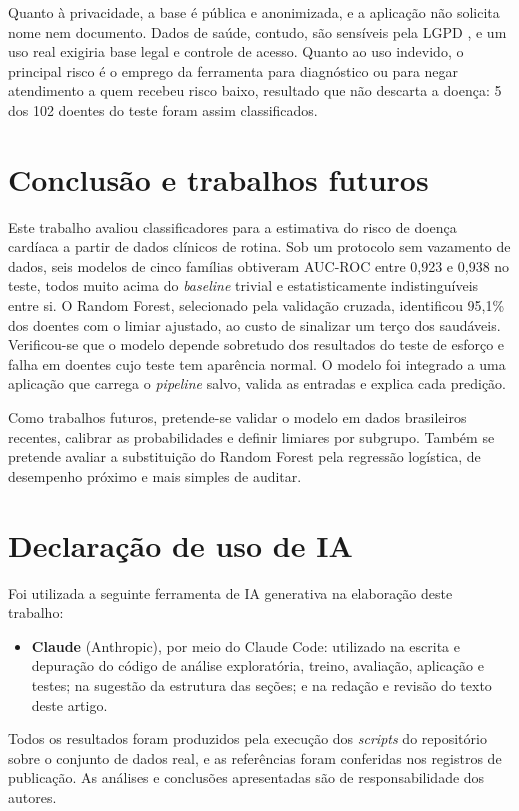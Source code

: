 \documentclass[12pt]{article}
\begin{document}
Quanto à privacidade, a base é pública e anonimizada, e a aplicação não
solicita nome nem documento. Dados de saúde, contudo, são sensíveis pela LGPD
\cite{lgpd:18}, e um uso real exigiria base legal e controle de acesso.
Quanto ao uso indevido, o principal risco é o emprego da ferramenta para
diagnóstico ou para negar atendimento a quem recebeu risco baixo, resultado
que não descarta a doença: 5 dos 102 doentes do teste foram assim
classificados.

\section{Conclusão e trabalhos futuros}
\label{sec:conclusao}

Este trabalho avaliou classificadores para a estimativa do risco de doença
cardíaca a partir de dados clínicos de rotina. Sob um protocolo sem vazamento
de dados, seis modelos de cinco famílias obtiveram AUC-ROC entre 0,923 e
0,938 no teste, todos muito acima do \textit{baseline} trivial e
estatisticamente indistinguíveis entre si. O Random Forest, selecionado pela
validação cruzada, identificou 95,1\% dos doentes com o limiar ajustado, ao
custo de sinalizar um terço dos saudáveis. Verificou-se que o modelo depende
sobretudo dos resultados do teste de esforço e falha em doentes cujo teste
tem aparência normal. O modelo foi integrado a uma aplicação que carrega o
\textit{pipeline} salvo, valida as entradas e explica cada predição.

Como trabalhos futuros, pretende-se validar o modelo em dados brasileiros
recentes, calibrar as probabilidades e definir limiares por subgrupo. Também
se pretende avaliar a substituição do Random Forest pela regressão logística,
de desempenho próximo e mais simples de auditar.

\section*{Declaração de uso de IA}

Foi utilizada a seguinte ferramenta de IA generativa na elaboração deste
trabalho:
\begin{itemize}
  \item \textbf{Claude} (Anthropic), por meio do Claude Code: utilizado na
  escrita e depuração do código de análise exploratória, treino, avaliação,
  aplicação e testes; na sugestão da estrutura das seções; e na redação e
  revisão do texto deste artigo.
\end{itemize}
Todos os resultados foram produzidos pela execução dos \textit{scripts} do
repositório sobre o conjunto de dados real, e as referências foram conferidas
nos registros de publicação. As análises e conclusões apresentadas são de
responsabilidade dos autores.



\end{document}

